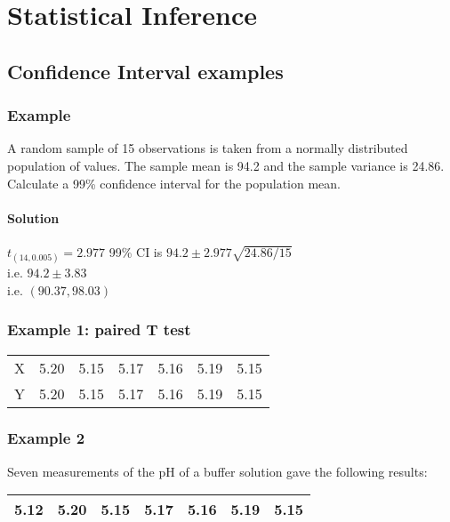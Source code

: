 \documentclass[12pt, a4paper]{report}
\theoremstyle{plain}
\theoremstyle{definition}
\theoremstyle{remark}
\begin{document}
\chapter{Statistical Inference}

\section{Confidence Interval examples}

\subsection{Example}
A random sample of 15 observations is taken from a normally distributed population
of values. The sample mean is 94.2 and the sample variance is 24.86.
Calculate a 99\% confidence interval for the population mean.


\subsubsection{Solution}
$t_(14,0.005) = 2.977$
99\% CI is $94.2 \pm 2.977 \sqrt{24.86/15}$ \\i.e. $94.2 \pm 3.83$ \\i.e. $(90.37,98.03)$


\subsection{Example 1: paired T test}


\begin{tabular}{|c|c|c|c|c|c|c|}
  \hline
X & 5.20 & 5.15 & 5.17 & 5.16 & 5.19 & 5.15\\
Y & 5.20 & 5.15 & 5.17 & 5.16 & 5.19 & 5.15\\
  \hline
\end{tabular}


\subsection{Example 2}

Seven measurements of the pH of a buffer solution gave the
following results:

\begin{tabular}{|c|c|c|c|c|c|c|}
  \hline
5.12 & 5.20 & 5.15 & 5.17 & 5.16 & 5.19 & 5.15\\
  \hline
\end{tabular}
\end{document}

